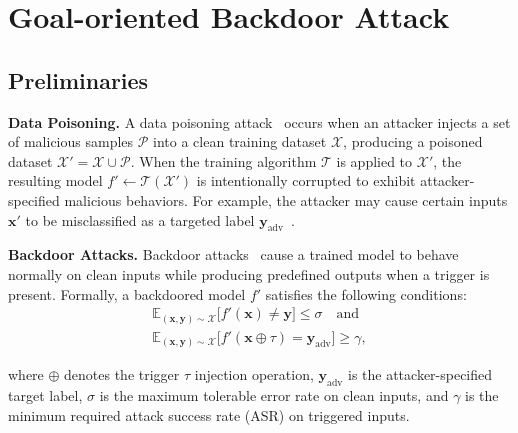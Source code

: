 \documentclass{article} %
\begin{document}
\section{Goal-oriented Backdoor Attack}

\subsection{Preliminaries}

\textbf{Data Poisoning.}  
A data poisoning attack~\citep{biggio2012poisoning} occurs when an attacker injects a set of malicious samples $\mathcal{P}$ into a clean training dataset $\mathcal{X}$, producing a poisoned dataset $\mathcal{X}' = \mathcal{X} \cup \mathcal{P}$. When the training algorithm $\mathcal{T}$ is applied to $\mathcal{X}'$, the resulting model $f' \leftarrow \mathcal{T}(\mathcal{X}')$ is intentionally corrupted to exhibit attacker-specified malicious behaviors. For example, the attacker may cause certain inputs $\mathbf{x}'$ to be misclassified as a targeted label $\mathbf{y}_{\text{adv}}$~\citep{barreno2006can,koh2017understanding,kloft2010online}. 

\textbf{Backdoor Attacks.}  
Backdoor attacks~\citep{gu2017badnets, li2021invisible, chen2017targeted, zhang2021backdoor} cause a trained model to behave normally on clean inputs while producing predefined outputs when a trigger is present. Formally, a backdoored model $f'$ satisfies the following conditions:
\begin{align}
    \mathbb{E}_{(\mathbf{x}, \mathbf{y}) \sim \mathcal{X}} \big[ f'(\mathbf{x}) \neq \mathbf{y} \big] \leq \sigma \quad\text{and}
\label{eq:backdoor_clean_general} \\
 \mathbb{E}_{(\mathbf{x}, \mathbf{y}) \sim \mathcal{X}} \big[ f'(\mathbf{x} \oplus \tau) = \mathbf{y}_{\text{adv}} \big] \geq \gamma,
\label{eq:backdoor_trigger_general}
\end{align}


where $\oplus$ denotes the trigger $\tau$ injection operation, $\mathbf{y}_{\text{adv}}$ is the attacker-specified target label, $\sigma$ is the maximum tolerable error rate on clean inputs, and $\gamma$ is the minimum required attack success rate (ASR) on triggered inputs. 
\end{document}
